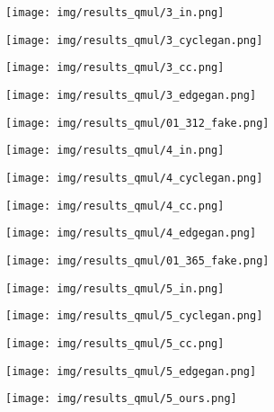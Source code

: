 \documentclass[10pt,twocolumn,letterpaper]{article}
\begin{document}
\begin{figure}[htbp]
\begin{center}
  \begin{subfigure}[b]{\qmulwidth\linewidth}
  \texttt{[image: img/results\_qmul/3\_in.png]}
  \end{subfigure}
  \begin{subfigure}[b]{\qmulwidth\linewidth}
  \texttt{[image: img/results\_qmul/3\_cyclegan.png]}
  \end{subfigure}
   \begin{subfigure}[b]{\qmulwidth\linewidth}
  \texttt{[image: img/results\_qmul/3\_cc.png]}
  \end{subfigure}
   \begin{subfigure}[b]{\qmulwidth\linewidth}
  \texttt{[image: img/results\_qmul/3\_edgegan.png]}
  \end{subfigure}
  \begin{subfigure}[b]{\qmulwidth\linewidth}
  \texttt{[image: img/results\_qmul/01\_312\_fake.png]}
  \end{subfigure}
  
 \begin{subfigure}[b]{\qmulwidth\linewidth}
  \texttt{[image: img/results\_qmul/4\_in.png]}
  \end{subfigure}
  \begin{subfigure}[b]{\qmulwidth\linewidth}
  \texttt{[image: img/results\_qmul/4\_cyclegan.png]}
  \end{subfigure}
  \begin{subfigure}[b]{\qmulwidth\linewidth}
  \texttt{[image: img/results\_qmul/4\_cc.png]}
  \end{subfigure}
   \begin{subfigure}[b]{\qmulwidth\linewidth}
  \texttt{[image: img/results\_qmul/4\_edgegan.png]}
  \end{subfigure}
  \begin{subfigure}[b]{\qmulwidth\linewidth}
  \texttt{[image: img/results\_qmul/01\_365\_fake.png]}
  \end{subfigure}
  
\begin{subfigure}[b]{\qmulwidth\linewidth}
  \texttt{[image: img/results\_qmul/5\_in.png]}
  \end{subfigure}
  \begin{subfigure}[b]{\qmulwidth\linewidth}
  \texttt{[image: img/results\_qmul/5\_cyclegan.png]}
  \end{subfigure}
   \begin{subfigure}[b]{\qmulwidth\linewidth}
  \texttt{[image: img/results\_qmul/5\_cc.png]}
  \end{subfigure}
   \begin{subfigure}[b]{\qmulwidth\linewidth}
  \texttt{[image: img/results\_qmul/5\_edgegan.png]}
  \end{subfigure}
  \begin{subfigure}[b]{\qmulwidth\linewidth}
  \texttt{[image: img/results\_qmul/5\_ours.png]}
  \end{subfigure}
  

\end{center}
\end{figure}
\end{document}
